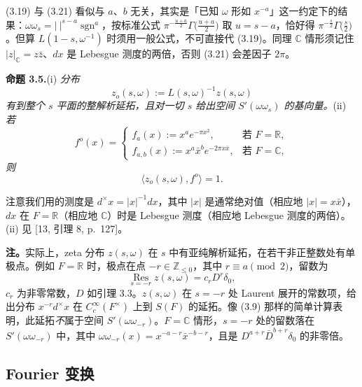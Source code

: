 \begin{annote}
(3.19) 与 (3.21) 看似与 $a$、$b$ 无关，其实是「已知 $\omega$ 形如 $x^{-a}$」这一约定下的结果：$\omega\omega_s=|\ |^{s-a}\operatorname{sgn}^a$，按标准公式 $\pi^{-\frac{u+a}{2}}\Gamma\bigl(\frac{u+a}{2}\bigr)$ 取 $u=s-a$，恰好得 $\pi^{-\frac{s}{2}}\Gamma\bigl(\frac{s}{2}\bigr)$。但算 $L(1-s,\omega^{-1})$ 时须用一般公式，不可直接代 (3.19)。同理 $\mathbb C$ 情形须记住 $|z|_\mathbb C=z\bar z$、$dx$ 是 Lebesgue 测度的两倍，否则 (3.21) 会差因子 $2\pi$。
\par\vspace{0.15em}{\raggedleft 【来源：Tate 论文 §4--§5；Weil《Basic Number Theory》第 VII 章（A）】\par}
\end{annote}

\medskip\noindent\textbf{命题 3.5.}\quad (i) \emph{分布}
\[
z_o(s,\omega):=L(s,\omega)^{-1}z(s,\omega)
\]
\emph{有到整个 $s$ 平面的整解析延拓，且对一切 $s$ 给出空间 $S'(\omega\omega_s)$ 的基向量。}(ii) \emph{若}
\[
f^o(x)=
\begin{cases}
f_a(x):=x^ae^{-\pi x^2},&\text{若 }F=\mathbb R,\\
f_{a,b}(x):=x^a\bar x^be^{-2\pi x\bar x},&\text{若 }F=\mathbb C,
\end{cases}
\]
\emph{则}
\[
\langle z_o(s,\omega),f^o\rangle=1.
\]

注意我们用的测度是 $d^\times x=|x|^{-1}dx$，其中 $|x|$ 是通常绝对值（相应地 $|x|=x\bar x$），$dx$ 在 $F=\mathbb R$（相应地 $\mathbb C$）时是 Lebesgue 测度（相应地 Lebesgue 测度的两倍）。(ii) 见 [13, 引理 8, p.~127]。

\medskip\noindent\textbf{注。}\quad 实际上，zeta 分布 $z(s,\omega)$ 在 $s$ 中有亚纯解析延拓，在若干非正整数处有单极点。例如 $F=\mathbb R$ 时，极点在点 $-r\in\mathbb Z_{\le0}$，其中 $r\equiv a\pmod 2$，留数为
\begin{equation*}\tag{3.22}
\operatorname*{Res}_{s=-r}z(s,\omega)=c_rD^r\delta_0,
\end{equation*}
$c_r$ 为非零常数，$D$ 如引理 3.3。$z(s,\omega)$ 在 $s=-r$ 处 Laurent 展开的常数项，给出分布 $x^{-r}d^\times x$ 在 $C_c^\infty(F^\times)$ 上到 $S(F)$ 的延拓。像 (3.9) 那样的简单计算表明，此延拓\emph{不}属于空间 $S'(\omega\omega_{-r})$。$F=\mathbb C$ 情形，$s=-r$ 处的留数落在 $S'(\omega\omega_{-r})$ 中，其中 $\omega\omega_{-r}(x)=x^{-a-r}\bar x^{-b-r}$，且是 $D^{a+r}\bar D^{b+r}\delta_0$ 的非零倍。

\subsection*{Fourier 变换}

